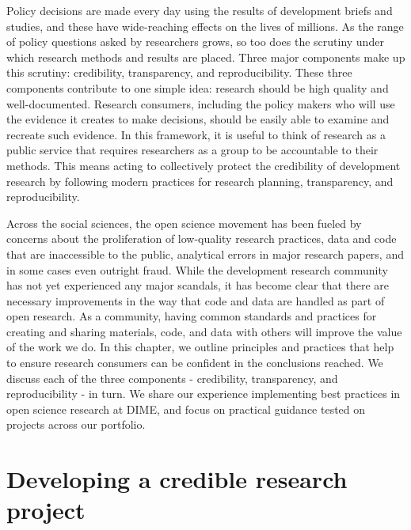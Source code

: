 
\begin{fullwidth}

	Policy decisions are made every day using the results of development briefs and studies,
	and these have wide-reaching effects on the lives of millions.
	As the range of policy questions asked by researchers grows,
	so too does the scrutiny under which research methods and results are placed.
  Three major components make up this scrutiny:
  credibility, transparency, and reproducibility.
  These three components contribute to one simple idea:
  research should be high quality and well-documented.
  Research consumers,
  including the policy makers who will use the evidence it creates to make decisions,
  should be easily able to examine and recreate such evidence.
	In this framework, it is useful to think of research as a public service
  that requires researchers as a group to be accountable to their methods.
	This means acting to collectively protect the credibility of development research
	by following modern practices for research planning, transparency, and reproducibility.

  Across the social sciences, the open science movement has been fueled
  by concerns about the proliferation of low-quality research practices,
	data and code that are inaccessible to the public,
  analytical errors in major research papers,
	and in some cases even outright fraud.
  While the development research community has not yet
  experienced any major scandals,
  it has become clear that there are necessary improvements
	in the way that code and data are handled as part of open research.
  As a community, having common standards and practices
  for creating and sharing materials, code, and data with others
  will improve the value of the work we do.
	In this chapter, we outline principles and practices that help to ensure
	research consumers can be confident in the conclusions reached.
We discuss each of the three components - credibility, transparency, and reproducibility - in turn.
  We share our experience implementing best practices in open science research at DIME,
  and focus on practical guidance tested on projects across our portfolio.


\end{fullwidth}


\section{Developing a credible research project}

